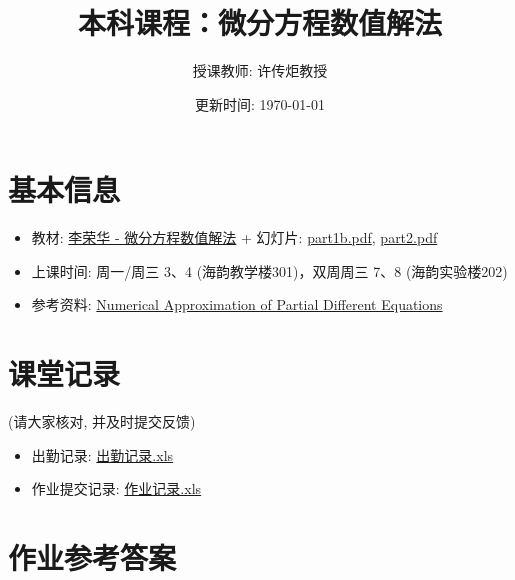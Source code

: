 \documentclass[a4paper,11pt]{article}
\title{本科课程：微分方程数值解法}
\author{授课教师: 许传炬教授}
\date{更新时间: \today}
\begin{document}
\maketitle

\vspace{-3em}

\section*{\large 基本信息}
\vspace{-1em}

\begin{itemize}
\item 教材: \href{https://wanghuaijin.github.io/assets/numDEs/LiRonghua.pdf}{李荣华 - 微分方程数值解法} + 幻灯片: \href{https://wanghuaijin.github.io/assets/numDEs/part1b.pdf}{part1b.pdf}, \href{https://wanghuaijin.github.io/assets/numDEs/part2.pdf}{part2.pdf}
\vspace{-1em}
\item 上课时间: 周一/周三 3、4 (海韵教学楼301)，双周周三 7、8 (海韵实验楼202)
\vspace{-1em}
\item 参考资料: \href{https://wanghuaijin.github.io/assets/numDEs/Alfio1994.pdf}{Numerical Approximation of Partial Different Equations}
\end{itemize}

\vspace{-2em}

\section*{\large 课堂记录}
\vspace{-1em}

(请大家核对, 并及时提交反馈)

\vspace{-1em}
\begin{itemize}
\item 出勤记录: \href{https://wanghuaijin.github.io/assets/numDEs/status/2024-2025_2_0_19020240157508.xls}{出勤记录.xls}
\vspace{-1em}
\item 作业提交记录: \href{https://wanghuaijin.github.io/assets/numDEs/status/homework1.xls}{作业记录.xls}
\end{itemize}



\vspace{-2em}

\section*{\large 作业参考答案}
\vspace{-1em}
\end{document}
